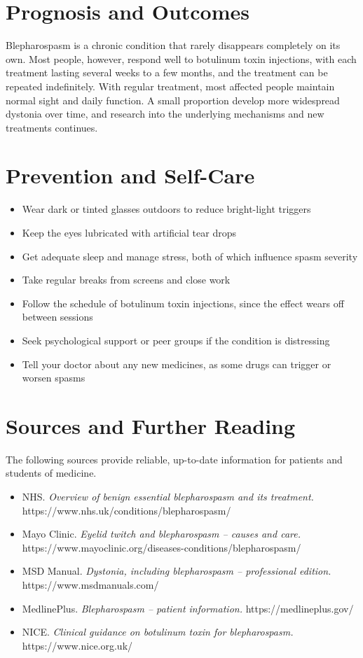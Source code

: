 \section*{Prognosis and Outcomes}
Blepharospasm is a chronic condition that rarely disappears completely on its own. Most people, however, respond well to botulinum toxin injections, with each treatment lasting several weeks to a few months, and the treatment can be repeated indefinitely. With regular treatment, most affected people maintain normal sight and daily function. A small proportion develop more widespread dystonia over time, and research into the underlying mechanisms and new treatments continues.

\section*{Prevention and Self-Care}
\begin{itemize}
    \item Wear dark or tinted glasses outdoors to reduce bright-light triggers
    \item Keep the eyes lubricated with artificial tear drops
    \item Get adequate sleep and manage stress, both of which influence spasm severity
    \item Take regular breaks from screens and close work
    \item Follow the schedule of botulinum toxin injections, since the effect wears off between sessions
    \item Seek psychological support or peer groups if the condition is distressing
    \item Tell your doctor about any new medicines, as some drugs can trigger or worsen spasms
\end{itemize}

\section*{Sources and Further Reading}
The following sources provide reliable, up-to-date information for patients and students of medicine.

\begin{itemize}
    \item NHS. \textit{Overview of benign essential blepharospasm and its treatment.} https://www.nhs.uk/conditions/blepharospasm/
    \item Mayo Clinic. \textit{Eyelid twitch and blepharospasm -- causes and care.} https://www.mayoclinic.org/diseases-conditions/blepharospasm/
    \item MSD Manual. \textit{Dystonia, including blepharospasm -- professional edition.} https://www.msdmanuals.com/
    \item MedlinePlus. \textit{Blepharospasm -- patient information.} https://medlineplus.gov/
    \item NICE. \textit{Clinical guidance on botulinum toxin for blepharospasm.} https://www.nice.org.uk/
\end{itemize}
